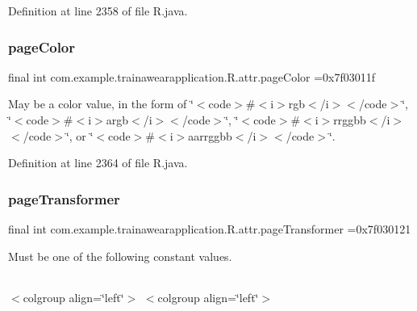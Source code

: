 Definition at line 2358 of file R.\+java.

\mbox{\label{classcom_1_1example_1_1trainawearapplication_1_1_r_1_1attr_acae8d8a1bdb4890ba7020c43c5a1bb02}} 
\subsubsection{\texorpdfstring{pageColor}{pageColor}}
{\footnotesize\ttfamily final int com.\+example.\+trainawearapplication.\+R.\+attr.\+page\+Color =0x7f03011f\hspace{0.3cm}{\ttfamily [static]}}

May be a color value, in the form of \char`\"{}$<$code$>$\#$<$i$>$rgb$<$/i$>$$<$/code$>$\char`\"{}, \char`\"{}$<$code$>$\#$<$i$>$argb$<$/i$>$$<$/code$>$\char`\"{}, \char`\"{}$<$code$>$\#$<$i$>$rrggbb$<$/i$>$$<$/code$>$\char`\"{}, or \char`\"{}$<$code$>$\#$<$i$>$aarrggbb$<$/i$>$$<$/code$>$\char`\"{}. 

Definition at line 2364 of file R.\+java.

\mbox{\label{classcom_1_1example_1_1trainawearapplication_1_1_r_1_1attr_a301935b9eeb18e965ee5ec037a76aaf0}} 
\subsubsection{\texorpdfstring{pageTransformer}{pageTransformer}}
{\footnotesize\ttfamily final int com.\+example.\+trainawearapplication.\+R.\+attr.\+page\+Transformer =0x7f030121\hspace{0.3cm}{\ttfamily [static]}}

Must be one of the following constant values.

\tabulinesep=1mm
\begin{longtabu}spread 0pt [c]{*{0}{|X[-1]}|}
\hline
\end{longtabu}
$<$colgroup align=\char`\"{}left\char`\"{}$>$ $<$colgroup align=\char`\"{}left\char`\"{}$>$ 

